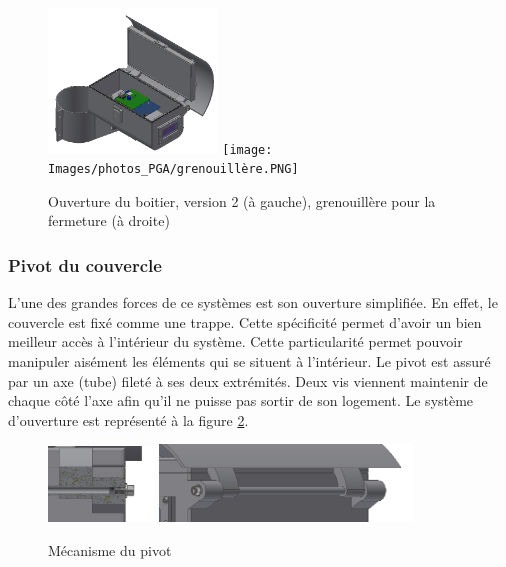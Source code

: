 \begin{figure}[H]
    \centering
    \includegraphics[width=0.4\textwidth]{Images/photos_PGA/Boitierv41.PNG}
    \texttt{[image: Images/photos\_PGA/grenouillère.PNG]}
    \caption{Ouverture du boitier, version 2 (à gauche), grenouillère pour la fermeture (à droite)}
    \label{fig:ouverturev2}
\end{figure}

\subsubsection{Pivot du couvercle}

L’une des grandes forces de ce systèmes est son ouverture simplifiée. En effet, le couvercle est fixé 
comme une trappe. Cette spécificité permet d’avoir un bien meilleur accès à l’intérieur du système. 
Cette particularité permet pouvoir manipuler aisément les éléments qui se situent à l’intérieur. Le 
pivot est assuré par un axe (tube) fileté à ses deux extrémités. Deux vis viennent maintenir de chaque 
côté l’axe afin qu’il ne puisse pas sortir de son logement. Le système d'ouverture est représenté à la 
figure \ref{fig:pivot}.

\begin{figure}[H]
    \centering
    \includegraphics[width=0.25\textwidth]{Images/photos_PGA/pivotcoupe.PNG}
    \includegraphics[width=0.6\textwidth]{Images/photos_PGA/pivotnormal.PNG}
    \caption{Mécanisme du pivot}
    \label{fig:pivot}
\end{figure}

